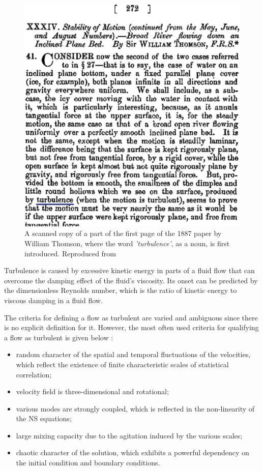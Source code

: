 \begin{figure}[ht]
    \centering
    \includegraphics{Figures/research_papers/schmitt2017turbulence-fig-1.jpg}
    \caption{A scanned copy of a part of the first page of the 1887 paper by William Thomson, where the word \textit{'turbulence'}, as a noun, is first introduced. Reproduced from \cite{schmitt2017turbulence}}
    \label{fig:schmitt2017turbulence-fig-1}
\end{figure}

Turbulence is caused by excessive kinetic energy in parts of a fluid flow that can overcome the damping effect of the fluid's viscosity. Its onset can be predicted by the dimensionless Reynolds number, which is the ratio of kinetic energy to viscous damping in a fluid flow. 

The criteria for defining a flow as turbulent are varied and ambiguous since there is no explicit definition for it. However, the most often used criteria for qualifying a flow as turbulent is given below \parencite{sagaut2002statistical}:
\begin{itemize}
    \item random character of the spatial and temporal fluctuations of the velocities, which reflect the existence of finite characteristic scales of statistical correlation;
    \item velocity field is three-dimensional and rotational;
    \item various modes are strongly coupled, which is reflected in the non-linearity of the NS equations;
    \item large mixing capacity due to the agitation induced by the various scales;
    \item chaotic character of the solution, which exhibits a powerful dependency on the initial condition and boundary conditions.
\end{itemize}

